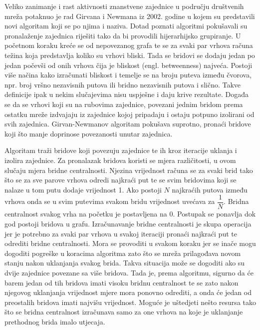 \documentclass[times, utf8, diplomski]{fer}
\begin{document}
Veliko zanimanje i rast aktivnosti znanstvene zajednice u području društvenih mreža potaknuo je rad \cite{girvan2002community} Girvana i Newmana iz 2002. godine  u kojem su predstavili novi algoritam koji se po njima i naziva. Dotad poznati algoritmi pokušavali su pronalaženje zajednica riješiti tako da bi provodili hijerarhijsko grupiranje. U početnom koraku kreće se od nepovezanog grafa te se za svaki par vrhova računa težina koja predstavlja koliko su vrhovi bliski. Tada se bridovi se dodaju jedan po jedan počevši od onih vrhova čija je bliskost (engl. betweenness) najveća. Postoji više načina kako izračunati bliskost i temelje se na broju puteva između čvorova, npr. broj vršno nezavisnih putova ili bridno nezavisnih putova i slično. Takve definicije ipak u nekim slučajevima nisu uspješne i daju krive rezultate. Događa se da se vrhovi koji su na rubovima zajednice, povezani jednim bridom prema ostatku mreže izdvajaju iz zajednice kojoj pripadaju i ostaju potpuno izolirani od svih zajednica. Girvan-Newmanov algoritam pokušava suprotno, pronaći bridove koji što manje doprinose povezanosti unutar zajednica. 

Algoritam traži bridove koji povezuju zajednice te ih kroz iteracije uklanja i izolira zajednice. Za pronalazak bridova koristi se mjera različitosti, u ovom slučaju mjera bridne centralnosti. Njezina vrijednost računa se za svaki brid tako što se za sve parove vrhova odredi najkraći put te se svim bridovima koji se nalaze u tom putu dodaje vrijednost 1. Ako postoji $N$ najkraćih putova između vrhova onda se u svim putevima svakom bridu vrijednost uvećava za $ \dfrac{1}{N} $. Bridna centralnost svakog vrha na početku je postavljena na 0. Postupak se ponavlja dok god postoji bridova u grafu. Izračunavanje bridne centralnosti je skupa operacija jer je potrebno za svaki par vrhova u svakoj iteraciji pronaći najkraći put te odrediti bridne centralnosti. Mora se provoditi u svakom koraku jer se inače mogu dogoditi pogreške u koracima algoritma zato što se mreža prilagođava novom stanju nakon uklanjanja svakog brida. Takva situacija može se dogoditi ako su dvije zajednice povezane sa više bridova. Tada je, prema algoritmu, sigurno da će barem jedan od tih bridova imati visoku bridnu centralnost te se zato nakon njegovog uklanjanja vrijednost mjere mora ponovno odrediti, a onda će jedan od preostalih bridova imati najvišu vrijednost. Moguće je uštedjeti nešto resursa tako što se bridna centralnost izračunava samo za one vrhova na koje je uklanjanje prethodnog brida imalo utjecaja. 
\end{document}
